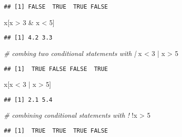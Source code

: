 \documentclass[
]{book}
\newenvironment{Shaded}{\begin{snugshade}}{\end{snugshade}}
\newcommand{\CommentTok}[1]{\textcolor[rgb]{0.56,0.35,0.01}{\textit{#1}}}
\newcommand{\DecValTok}[1]{\textcolor[rgb]{0.00,0.00,0.81}{#1}}
\newcommand{\NormalTok}[1]{#1}
\newcommand{\SpecialCharTok}[1]{\textcolor[rgb]{0.00,0.00,0.00}{#1}}
\begin{document}
\begin{verbatim}
## [1] FALSE  TRUE  TRUE FALSE
\end{verbatim}

\begin{Shaded}
\begin{Highlighting}[]
\NormalTok{x[x }\SpecialCharTok{\textgreater{}} \DecValTok{3} \SpecialCharTok{\&}\NormalTok{ x }\SpecialCharTok{\textless{}} \DecValTok{5}\NormalTok{]}
\end{Highlighting}
\end{Shaded}

\begin{verbatim}
## [1] 4.2 3.3
\end{verbatim}

\begin{Shaded}
\begin{Highlighting}[]
\CommentTok{\# combing two conditional statements with |}
\NormalTok{x }\SpecialCharTok{\textless{}} \DecValTok{3} \SpecialCharTok{|}\NormalTok{ x }\SpecialCharTok{\textgreater{}} \DecValTok{5}
\end{Highlighting}
\end{Shaded}

\begin{verbatim}
## [1]  TRUE FALSE FALSE  TRUE
\end{verbatim}

\begin{Shaded}
\begin{Highlighting}[]
\NormalTok{x[x }\SpecialCharTok{\textless{}} \DecValTok{3} \SpecialCharTok{|}\NormalTok{ x }\SpecialCharTok{\textgreater{}} \DecValTok{5}\NormalTok{]}
\end{Highlighting}
\end{Shaded}

\begin{verbatim}
## [1] 2.1 5.4
\end{verbatim}

\begin{Shaded}
\begin{Highlighting}[]
\CommentTok{\# combining conditional statements with !}
\SpecialCharTok{!}\NormalTok{x }\SpecialCharTok{\textgreater{}} \DecValTok{5}
\end{Highlighting}
\end{Shaded}

\begin{verbatim}
## [1]  TRUE  TRUE  TRUE FALSE
\end{verbatim}
\end{document}
